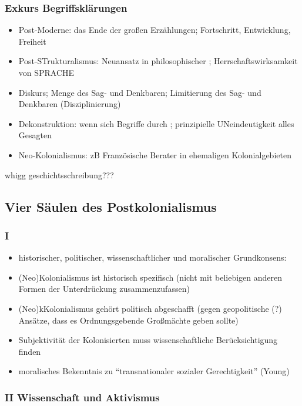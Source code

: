 \documentclass[emulatestandardclasses]{scrartcl}
\begin{document}
\subsubsection{Exkurs Begriffsklärungen}

\begin{itemize}
  \item Post-Moderne: das Ende der großen Erzählungen; Fortschritt, Entwicklung, Freiheit
  \item Post-STrukturalismus: Neuansatz in philosophischer ; Herrschaftswirksamkeit von SPRACHE 
  \item Diskurs; Menge des Sag- und Denkbaren; Limitierung des Sag- und Denkbaren (Disziplinierung)
  \item Dekonstruktion: wenn sich Begriffe durch ; prinzipielle UNeindeutigkeit alles Gesagten
  \item Neo-Kolonialismus: zB Französische Berater in ehemaligen Kolonialgebieten
\end{itemize}

whigg geschichtsschreibung???


\subsection{Vier Säulen des Postkolonialismus}

\subsubsection{I}

\begin{itemize}
  \item historischer, politischer, wissenschaftlicher und moralischer Grundkonsens:
  \item (Neo)Kolonialismus ist historisch spezifisch (nicht mit beliebigen anderen Formen der Unterdrückung zusammenzufassen)
  \item (Neo)kKolonialismus gehört politisch abgeschafft (gegen geopolitische (?) Ansätze, dass es Ordnungsgebende Großmächte geben sollte)
  \item Subjektivität der Kolonisierten muss wissenschaftliche Berücksichtigung finden
  \item moralisches Bekenntnis zu "`transnationaler sozialer Gerechtigkeit"' (Young)
\end{itemize}

\subsubsection{II Wissenschaft und Aktivismus}
\end{document}
